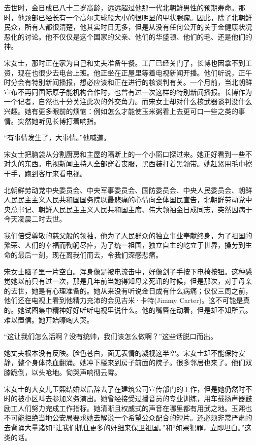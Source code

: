 去世时，金日成已八十二岁高龄，远远超过他那一代北朝鲜男性的预期寿命。那时，他颈部已经长有一个高尔夫球般大小的很明显的甲状腺瘤。因此，除了北朝鲜民众，所有人都很清楚，他其实时日无多，但是从没有任何公开的关于金健康状况恶化的讨论。他不仅仅是这个国家的父亲、他们的华盛顿、他们的毛、还是他们的神。

宋女士，那时正在家为自己和丈夫准备午餐。工厂已经关门了，长博也因拿不到工资，现在也很少去电台上班。他正坐在正屋里等着电视新闻开播。他们听说，正午时分会有特别新闻播报，想必应该和正在进行的核谈判有关。一个月前，当北朝鲜宣布不再同国际原子能机构合作时，也曾有过一次这样的特别新闻播报。长博作为一个记者，自然也十分关注此次的外交角力。而宋女士却对什么核武器谈判没什么兴趣。她有更多眼前的烦恼：例如怎么才能使玉米粥看上去更可口一些之类的事情。突然她听见长博打着响指。

“有事情发生了，大事情。”他喊道。

宋女士把脑袋从分割厨房和主屋的隔断上的一个小窗口探过来。她正好看到一些不对头的东西。电视新闻主持人全部穿着丧服，黑西装打着黑领带。她赶紧用毛巾擦干手，跑到客厅来看电视。

北朝鲜劳动党中央委员会、中央军事委员会、国防委员会、中央人民委员会、朝鲜人民民主主义人民共和国国务院以最悲痛的心情向全体国民宣告，北朝鲜劳动党中央总书记、朝鲜人民民主主义人民共和国主席、伟大领袖金日成同志，突然因病于今天凌晨二时去世。

我们倍受尊敬的慈父般的领袖，他为了人民群众的独立事业奉献终身，为了祖国的繁荣、人们的幸福而鞠躬尽瘁，为了统一祖国，独立自主的屹立于世界，操劳到生命的最后一刻，现在离我们而去，令我们深感悲痛。

宋女士脑子里一片空白。浑身像是被电流击中，好像刽子手按下电椅按钮。这种感觉她以前只有过一次，那是几年前当她得知母亲死讯的时候，但是那次，对于母亲的去世，她是有心理准备的。她从来没有听说金日成有什么病痛；仅仅三周之前，他们还在电视上看到他精力充沛的会见吉米·卡特(Jimmy Carter)。这不可能是真的。她试图集中精神好好听听电视里说什么。他的嘴唇在动着，但是却不知所云。难以置信。她开始嚎啕大哭。

“这让我们怎么活啊？没有统帅，我们该怎么做啊？”这些话脱口而出。

她丈夫根本没有反映。脸色苍白，面无表情的凝视这半空。宋女士却不能保持安静，整个身体热血翻涌。她冲下楼来到房子前面的院子。很多邻居也来了。他们双膝跪倒，以头呛地。恸哭声响彻云霄。

宋女士的大女儿玉熙结婚以后辞去了在建筑公司宣传部门的工作，但是她仍然时不时的被小区叫去参加义务演出。她曾经接受过播音员的专业训练，用车载扬声器鼓励工人们努力完成工作指标。她清晰且权威式的声音在哪里都有用武之地。玉熙也不可能拒绝当地公安局要求她去解说一个希望公众配合的短片。还必须非常严肃的去背诵大量诸如“让我们抓住更多的奸细来保卫祖国。”和“如果犯罪，立即坦白。”这类的话。

